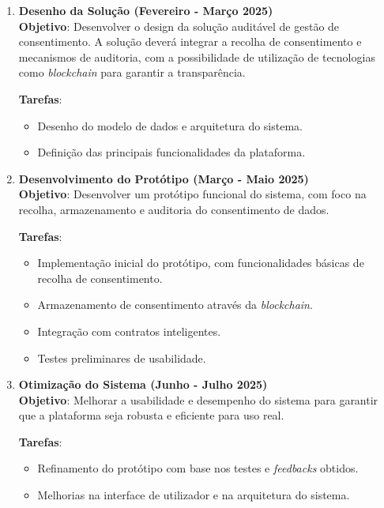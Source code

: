 \begin{enumerate}
    \item \textbf{Desenho da Solução (Fevereiro - Março 2025)} \\
    \textbf{Objetivo}: Desenvolver o design da solução auditável de gestão de consentimento. A solução deverá integrar a recolha de consentimento e mecanismos de auditoria, com a possibilidade de utilização de tecnologias como \textit{blockchain} para garantir a transparência.
    
    \textbf{Tarefas}:
    \begin{itemize}
        \item Desenho do modelo de dados e arquitetura do sistema.
        \item Definição das principais funcionalidades da plataforma.
    \end{itemize}

    \item \textbf{Desenvolvimento do Protótipo (Março - Maio 2025)} \\
    \textbf{Objetivo}: Desenvolver um protótipo funcional do sistema, com foco na recolha, armazenamento e auditoria do consentimento de dados.
     
    \textbf{Tarefas}:
    \begin{itemize}
        \item Implementação inicial do protótipo, com funcionalidades básicas de recolha de consentimento.
        \item Armazenamento de consentimento através da \textit{blockchain}.
        \item Integração com contratos inteligentes.
        \item Testes preliminares de usabilidade.
    \end{itemize}

    \item \textbf{Otimização do Sistema (Junho - Julho 2025)} \\
    \textbf{Objetivo}: Melhorar a usabilidade e desempenho do sistema para garantir que a plataforma seja robusta e eficiente para uso real.
     
    \textbf{Tarefas}:
    \begin{itemize}
        \item Refinamento do protótipo com base nos testes e \textit{\textit{feedback}s} obtidos.
        \item Melhorias na interface de utilizador e na arquitetura do sistema.
    \end{itemize}


\end{enumerate}
